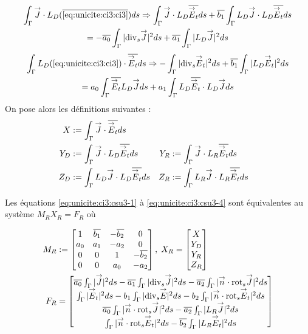     \begin{multline}
    \label{eq:unicite:ci3:csu3-5}
    \int_\Gamma \vJ \cdot L_D ( \conj{\eqref{eq:unicite:ci3:ci3}} ) ds \Rightarrow
    \int_\Gamma \vJ \cdot L_D \conj{\vE_t} ds  + \conj{b_1} \int_\Gamma L_D \vJ \cdot L_D \conj{\vE_t} ds \\
    = - \conj{a_0} \int_\Gamma |\tdivs \vJ|^2ds + \conj{a_1} \int_\Gamma | L_D \vJ|^2 ds
  \end{multline}
  \begin{multline}
    \label{eq:unicite:ci3:csu3-6}
    \int_\Gamma  L_D ( \eqref{eq:unicite:ci3:ci3} ) \cdot \conj{\vE_t} ds \Rightarrow
    -\int_\Gamma | \tdivs \vE_t |^2 ds  + \conj{b_1} \int_\Gamma | L_D \vE_t|^2 ds \\
    = a_0 \int_\Gamma \conj{\vE_t} L_D \vJ ds + a_1 \int_\Gamma L_D \conj{\vE_t} \cdot L_D \vJ ds
  \end{multline}
  On pose alors les définitions suivantes :
  \begin{align*}
    X&:= \int_\Gamma {\overset{\rightarrow}{J}} \cdot {\overline{{\overset{\rightarrow}{E}}_t}} ds\\
    Y_D&:= \int_\Gamma {\overset{\rightarrow}{J}} \cdot L_D {\overline{{\overset{\rightarrow}{E}}_t}} ds
    &Y_R&:= \int_\Gamma {\overset{\rightarrow}{J}} \cdot L_R {\overline{{\overset{\rightarrow}{E}}_t}} ds\\
    Z_D&:= \int_\Gamma L_D {\overset{\rightarrow}{J}} \cdot L_D {\overline{{\overset{\rightarrow}{E}}_t}} ds
    &Z_R&:= \int_\Gamma L_R {\overset{\rightarrow}{J}} \cdot L_R {\overline{{\overset{\rightarrow}{E}}_t}} ds
  \end{align*}

  Les équations \eqref{eq:unicite:ci3:csu3-1} à \eqref{eq:unicite:ci3:csu3-4} sont équivalentes au système \(M_R X_R = F_R\) où

  \begin{align*}
    M_R&:=
    \begin{bmatrix}
      1&{\overline{b_1}}&-{\overline{b_2}}&0\\
      a_0&a_1&-a_2&0\\
      0&0&1&-{\overline{b_2}}\\
      0&0&a_0&-a_2\\
    \end{bmatrix},\;
    X_R =
    \begin{bmatrix}
      X\\
      Y_D\\
      Y_R\\
      Z_R
    \end{bmatrix}\\
    F_R &=
    \begin{bmatrix}
      {\overline{a_0}} \int_\Gamma |{\overset{\rightarrow}{J}}|^2ds - {\overline{a_1}} \int_\Gamma |{\operatorname{div}_s} {\overset{\rightarrow}{J}}|^2 ds - {\overline{a_2}} \int_\Gamma |{\overset{\rightarrow}{n}} \cdot {{\operatorname{rot}}_s} {\overset{\rightarrow}{J}}|^2 ds \\
      \int_\Gamma |{\overset{\rightarrow}{E}}_t|^2 ds  - b_1 \int_\Gamma | {\operatorname{div}_s} {\overset{\rightarrow}{E}} |^2 ds - b_2 \int_\Gamma | {\overset{\rightarrow}{n}} \cdot {{\operatorname{rot}}_s} {\overset{\rightarrow}{E}}_t|^2 ds \\
      {\overline{a_0}} \int_\Gamma |{\overset{\rightarrow}{n}} \cdot {{\operatorname{rot}}_s} {\overset{\rightarrow}{J}}|^2ds - {\overline{a_2}} \int_\Gamma | L_R {\overset{\rightarrow}{J}}|^2 ds \\
      \int_\Gamma | {\overset{\rightarrow}{n}} \cdot {{\operatorname{rot}}_s} {\overset{\rightarrow}{E}}_t |^2 ds  - {\overline{b_2}} \int_\Gamma | L_R {\overset{\rightarrow}{E}}_t|^2 ds
    \end{bmatrix}
  \end{align*}

